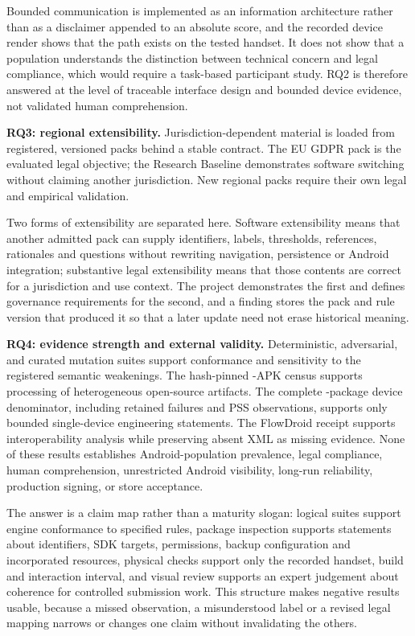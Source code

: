 Bounded communication is implemented as an information architecture rather than as a disclaimer appended to an absolute score, and the recorded device render shows that the path exists on the tested handset. It does not show that a population understands the distinction between technical concern and legal compliance, which would require a task-based participant study. RQ2 is therefore answered at the level of traceable interface design and bounded device evidence, not validated human comprehension.

\textbf{RQ3: regional extensibility.} Jurisdiction-dependent material is loaded from registered, versioned packs behind a stable contract. The EU GDPR pack is the evaluated legal objective; the Research Baseline demonstrates software switching without claiming another jurisdiction. New regional packs require their own legal and empirical validation.

Two forms of extensibility are separated here. Software extensibility means that another admitted pack can supply identifiers, labels, thresholds, references, rationales and questions without rewriting navigation, persistence or Android integration; substantive legal extensibility means that those contents are correct for a jurisdiction and use context. The project demonstrates the first and defines governance requirements for the second, and a finding stores the pack and rule version that produced it so that a later update need not erase historical meaning.

\textbf{RQ4: evidence strength and external validity.} Deterministic, adversarial, and curated mutation suites support conformance and sensitivity to the registered semantic weakenings. The hash-pinned \FDroidCensusN{}-APK census supports processing of heterogeneous open-source artifacts. The complete \DevicePackagesN{}-package device denominator, including \FailedDeviceWorkflowsN{} retained failures and \PssObservedN{} PSS observations, supports only bounded single-device engineering statements. The FlowDroid receipt supports interoperability analysis while preserving absent XML as missing evidence. None of these results establishes Android-population prevalence, legal compliance, human comprehension, unrestricted Android visibility, long-run reliability, production signing, or store acceptance.

The answer is a claim map rather than a maturity slogan: logical suites support engine conformance to specified rules, package inspection supports statements about identifiers, SDK targets, permissions, backup configuration and incorporated resources, physical checks support only the recorded handset, build and interaction interval, and visual review supports an expert judgement about coherence for controlled submission work. This structure makes negative results usable, because a missed observation, a misunderstood label or a revised legal mapping narrows or changes one claim without invalidating the others.

